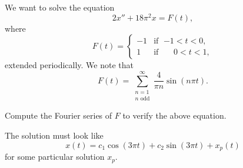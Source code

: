 \documentclass[12pt]{book}
\begin{document}
\begin{example}
We want to solve the equation
\begin{equation*}
2 x'' + 18 \pi^2 x = F(t) ,
\end{equation*}
where
\begin{equation*}
F(t) =
\begin{cases}
-1 & \text{if } \; {-1} < t < 0 , \\
1 & \text{if } \; \phantom{-}0 < t < 1 ,
\end{cases}
\end{equation*}
extended periodically.  We note that
\begin{equation*}
F(t) =
\sum_{\substack{n=1 \\ n \text{ odd}}}^\infty
\frac{4}{\pi n}
\sin (n \pi t) . 
\end{equation*}

\begin{exercise}
Compute the Fourier series of $F$ to verify the above equation.
\end{exercise}

The solution must look like
\begin{equation*}
x(t) = c_1 \cos  (3\pi t) + c_2 \sin (3\pi t) + x_p (t)
\end{equation*}
for some particular solution $x_p$.


\end{example}
\end{document}
